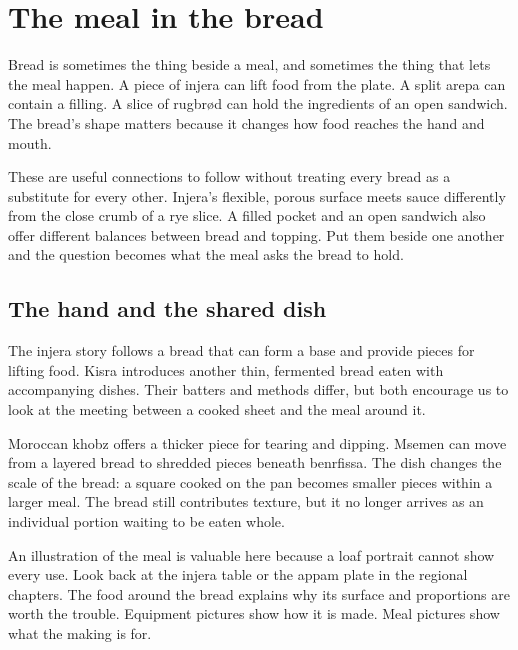 \chapter{The meal in the bread}\label{connection:meals}

Bread is sometimes the thing beside a meal, and sometimes the thing that lets the meal happen. A piece of injera can lift food from the plate. A split arepa can contain a filling. A slice of rugbrød can hold the ingredients of an open sandwich. The bread's shape matters because it changes how food reaches the hand and mouth.

These are useful connections to follow without treating every bread as a substitute for every other. Injera's flexible, porous surface meets sauce differently from the close crumb of a rye slice. A filled pocket and an open sandwich also offer different balances between bread and topping. Put them beside one another and the question becomes what the meal asks the bread to hold.

\section{The hand and the shared dish}
The injera story follows a bread that can form a base and provide pieces for lifting food. Kisra introduces another thin, fermented bread eaten with accompanying dishes. Their batters and methods differ, but both encourage us to look at the meeting between a cooked sheet and the meal around it.\citep{foodishinjera,moggakisra}

Moroccan khobz offers a thicker piece for tearing and dipping. Msemen can move from a layered bread to shredded pieces beneath benrfissa. The dish changes the scale of the bread: a square cooked on the pan becomes smaller pieces within a larger meal. The bread still contributes texture, but it no longer arrives as an individual portion waiting to be eaten whole.\citep{benkhobz,benrfissa}

An illustration of the meal is valuable here because a loaf portrait cannot show every use. Look back at the injera table or the appam plate in the regional chapters. The food around the bread explains why its surface and proportions are worth the trouble. Equipment pictures show how it is made. Meal pictures show what the making is for.

